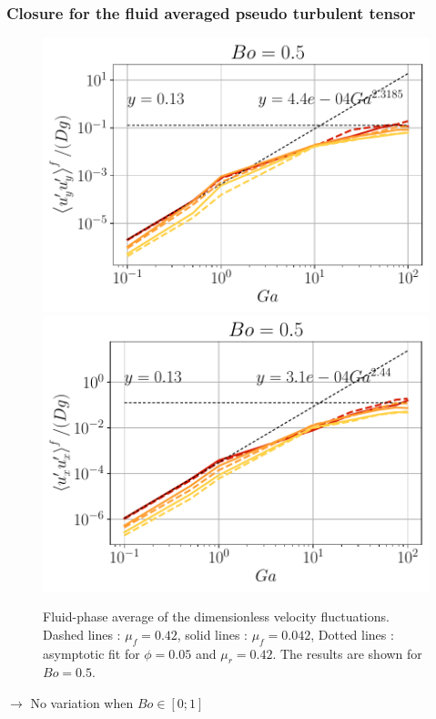 \documentclass[aspectratio=169]{beamer}
\begin{document}
\begin{frame}
  \frametitle{Closure for the fluid averaged pseudo turbulent tensor }
  \begin{figure}[h!]
    \centering
    \includegraphics[height=0.5\textheight]{image/N_10/UU/UU_fyy_Bo_0_5.pdf}
    \includegraphics[height=0.5\textheight]{image/N_10/UU/UU_fxx_Bo_0_5.pdf}
    \caption{Fluid-phase average of the dimensionless velocity fluctuations. Dashed lines : $\mu_f = 0.42$, solid lines : $\mu_f = 0.042$, Dotted lines : asymptotic fit for $\phi = 0.05$ and $\mu_r = 0.42$. The results are shown for $Bo = 0.5$.} 
    \label{fig:UUf}
  \end{figure} 
  $\rightarrow$ No variation when $Bo\in[0;1]$
\end{frame}
\end{document}

